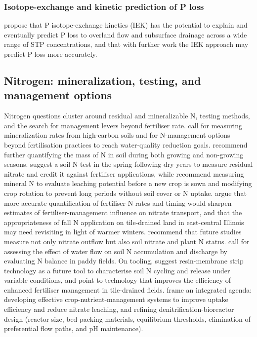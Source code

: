 \documentclass[11pt]{article}
\begin{document}
\subsubsection{Isotope-exchange and kinetic prediction of P loss}

\textcite{McDowell2001} propose that P isotope-exchange kinetics (IEK) has the potential to explain and eventually predict P loss to overland flow and subsurface drainage across a wide range of STP concentrations, and that with further work the IEK approach may predict P loss more accurately.

\subsection{Nitrogen: mineralization, testing, and management options}

Nitrogen questions cluster around residual and mineralizable N, testing methods, and the search for management levers beyond fertiliser rate. \textcite{Waring2022} call for measuring mineralization rates from high-carbon soils and for N-management options beyond fertilisation practices to reach water-quality reduction goals. \textcite{Bosompemaa2021} recommend further quantifying the mass of N in soil during both growing and non-growing seasons. \textcite{RANDALL1995} suggest a soil N test in the spring following dry years to measure residual nitrate and credit it against fertiliser applications, while \textcite{Conrad2009} recommend measuring mineral N to evaluate leaching potential before a new crop is sown and modifying crop rotation to prevent long periods without soil cover or N uptake. \textcite{Gentry2014} argue that more accurate quantification of fertiliser-N rates and timing would sharpen estimates of fertiliser-management influence on nitrate transport, and that the appropriateness of fall N application on tile-drained land in east-central Illinois may need revisiting in light of warmer winters. \textcite{ElGhannam2023} recommend that future studies measure not only nitrate outflow but also soil nitrate and plant N status. \textcite{Saiki2020} call for assessing the effect of water flow on soil N accumulation and discharge by evaluating N balance in paddy fields. On tooling, \textcite{Masri2024} suggest resin-membrane strip technology as a future tool to characterise soil N cycling and release under variable conditions, and \textcite{Kaur2024b} point to technology that improves the efficiency of enhanced fertiliser management in tile-drained fields. \textcite{Aide2016} frame an integrated agenda: developing effective crop-nutrient-management systems to improve uptake efficiency and reduce nitrate leaching, and refining denitrification-bioreactor design (reactor size, bed packing materials, equilibrium thresholds, elimination of preferential flow paths, and pH maintenance).
\end{document}
